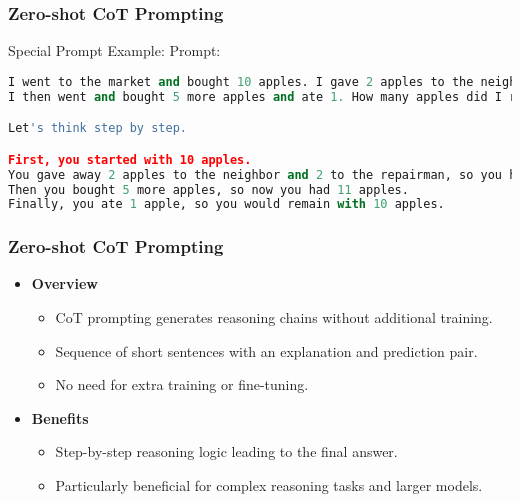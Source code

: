 \begin{frame}[fragile]\frametitle{Zero-shot CoT Prompting}


Special Prompt Example: Prompt:
\begin{lstlisting}[language=python]
I went to the market and bought 10 apples. I gave 2 apples to the neighbor and 2 to the repairman.
I then went and bought 5 more apples and ate 1. How many apples did I remain with?

Let's think step by step.

First, you started with 10 apples.
You gave away 2 apples to the neighbor and 2 to the repairman, so you had 6 apples left.
Then you bought 5 more apples, so now you had 11 apples.
Finally, you ate 1 apple, so you would remain with 10 apples.
\end{lstlisting}


\end{frame}


\begin{frame}[fragile]\frametitle{Zero-shot CoT Prompting}

\begin{itemize}
  \item \textbf{Overview}
    \begin{itemize}
      \item CoT prompting generates reasoning chains without additional training.
      \item Sequence of short sentences with an explanation and prediction pair.
      \item No need for extra training or fine-tuning.
    \end{itemize}

  \item \textbf{Benefits}
    \begin{itemize}
      \item Step-by-step reasoning logic leading to the final answer.
      \item Particularly beneficial for complex reasoning tasks and larger models.
    \end{itemize}
\end{itemize}

\end{frame}

